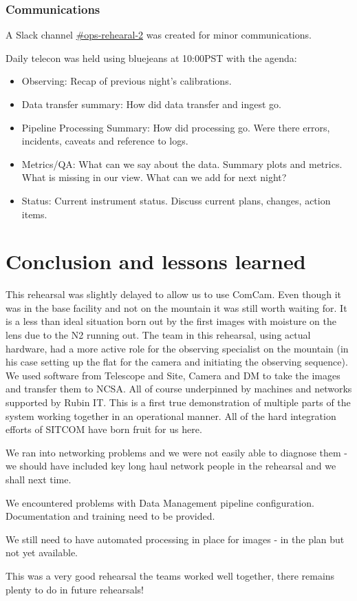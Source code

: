 \subsubsection{Communications }


A Slack channel \href{https://lsstc.slack.com/messages/CJBSY6FUN}{\#ops-rehearal-2} was created for minor communications.

Daily telecon was held using bluejeans at 10:00PST with the agenda:
\begin{itemize}
\item Observing: Recap of previous night's calibrations.
\item Data transfer summary:  How did data transfer and ingest go.
\item Pipeline Processing Summary: 	How did processing go.  Were there errors, incidents, caveats and reference to logs.
\item Metrics/QA:  What can we say about the data. Summary plots and metrics.  What is missing in our view. What can we add for next night?
\item Status:   Current instrument status.  Discuss current plans, changes, action items.

\end{itemize}







\section{Conclusion and lessons learned}\label{sec:conc}
This rehearsal was slightly delayed to allow us to use ComCam. Even though it was in the base facility and not on the mountain it was still worth waiting for.
It is a less than ideal situation born out by the first images with moisture on the lens due to the N2 running out.
The team in this rehearsal, using actual hardware, had a more active role for the observing specialist on the mountain (in his case setting up the flat for the camera and initiating the observing sequence).
We used software from Telescope and Site, Camera and DM to take the images and transfer them to NCSA.
All of course underpinned by machines and networks  supported by Rubin IT.
This is a first true demonstration of multiple parts of the system working together in an operational manner.
All of the hard integration efforts of SITCOM have born fruit for us here.

We ran into networking problems and we were not easily able to diagnose them - we should have included key long haul network people in the rehearsal and we shall next time.

We encountered problems with Data Management pipeline configuration. Documentation and training need to be provided.

We still need to have automated processing in place for images - in the plan but not yet available.

This was a very good rehearsal the teams worked well together, there remains plenty to do in future rehearsals!





